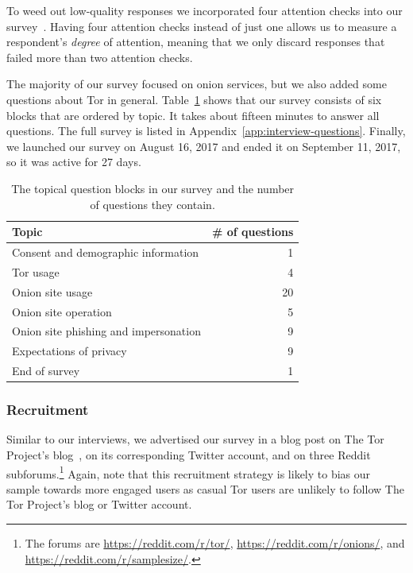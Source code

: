 To weed out low-quality responses we incorporated four attention checks into our
survey~\cite{Berinsky2014a}.  Having four attention checks instead of just one
allows us to measure a respondent's \emph{degree} of attention, meaning that we
only discard responses that failed more than two attention checks.

The majority of our survey focused on onion services, but we also added some
questions about Tor in general.  Table~\ref{tab:survey-structure} shows that our
survey consists of six blocks that are ordered by topic.  It takes about fifteen
minutes to answer all questions.  The full survey is listed in
Appendix~\ref{app:interview-questions}.  Finally, we launched our survey on
August 16, 2017 and ended it on September 11, 2017, so it was active for 27
days.

\begin{table}[t]
	\centering
	\begin{tabular}{l r}
	\toprule
	Topic & \# of questions \\
	\midrule
	Consent and demographic information & 1 \\
	Tor usage & 4 \\
	Onion site usage & 20 \\
	Onion site operation & 5 \\
	Onion site phishing and impersonation & 9 \\
	Expectations of privacy & 9 \\
	End of survey & 1 \\
	\bottomrule
	\end{tabular}
	\caption{The topical question blocks in our survey and the number of
	questions they contain.}
	\label{tab:survey-structure}
\end{table}

\subsubsection{Recruitment}

Similar to our interviews, we advertised our survey in a blog post on The Tor
Project's blog~\cite{Winter2017a}, on its corresponding Twitter account, and on
three Reddit subforums.\footnote{The forums are \url{https://reddit.com/r/tor/},
\url{https://reddit.com/r/onions/}, and \url{https://reddit.com/r/samplesize/}.}
Again, note that this recruitment strategy is likely to bias our sample towards
more engaged users as casual Tor users are unlikely to follow The Tor Project's
blog or Twitter account.

